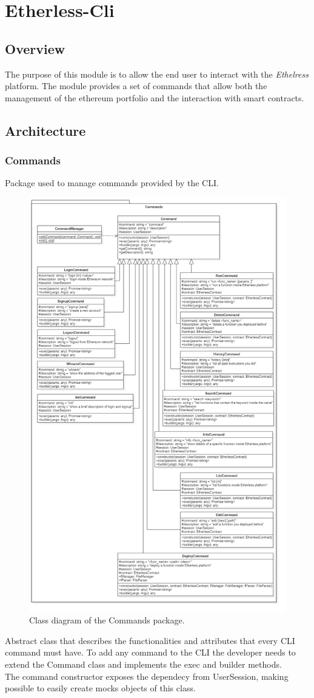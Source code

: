 \section{Etherless-Cli}	

	\subsection{Overview}
	The purpose of this module is to allow the end user to interact with the \textit{Ethelress} platform. The module provides a set of commands that allow both the management of the ethereum portfolio and the interaction with smart contracts.
	
	\subsection{Architecture}
		\subsubsection{Commands}
		Package used to manage commands provided by the CLI.
		\begin{figure} [H]
			\centering
			\includegraphics[width=0.6\linewidth]{diagrammi/etherless-cli/Commands}
			\caption{Class diagram of the Commands package.}
		\end{figure}
	
			Abstract class that describes the functionalities and attributes that every CLI command must have. To add any command to the CLI the developer needs to extend the Command class and implements the exec and builder methods. \\ 
			The command constructor exposes the dependecy from UserSession, making possible to  easily create mocks objects of this class. 
			
